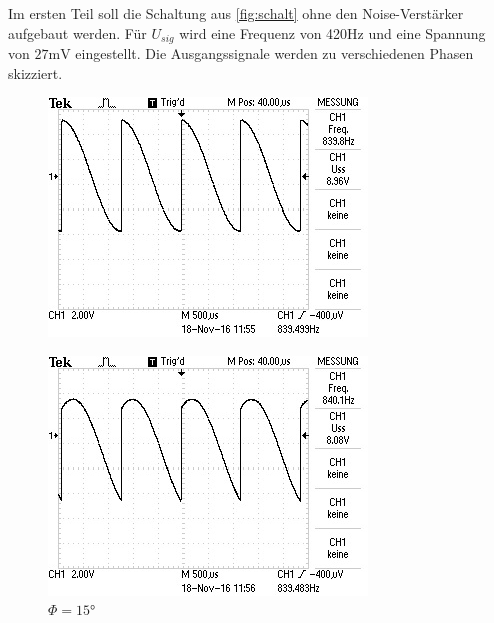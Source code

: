 Im ersten Teil soll die Schaltung aus \ref{fig:schalt} ohne den Noise-Verstärker
aufgebaut werden. Für $U_{sig}$ wird eine Frequenz von 420$\si{\hertz}$ und eine
Spannung von $27\si{\milli\volt}$ eingestellt. Die Ausgangssignale werden zu
verschiedenen Phasen skizziert.
\begin{figure}[!h]
  \begin{minipage}[t]{0.3\textwidth}
    \includegraphics[width=\textwidth]{Bilder/15.jpeg}
    \label{fig:15}
    \caption{$\Phi=15\si{\degree}$}
  \end{minipage}
  \hspace{12pt}
  \vspace{5pt}
  \begin{minipage}[t]{0.3\textwidth}
    \includegraphics[width=\textwidth]{Bilder/45.jpeg}

\end{minipage}
\end{figure}
